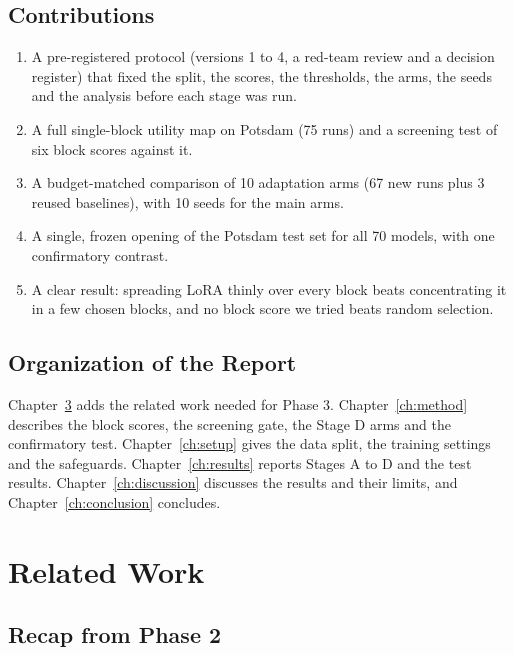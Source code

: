\documentclass[11pt,a4paper]{report}
\begin{document}
\section{Contributions}

\begin{enumerate}
    \item A pre-registered protocol (versions 1 to 4, a red-team review and a decision register) that fixed the split, the scores, the thresholds, the arms, the seeds and the analysis before each stage was run.
    \item A full single-block utility map on Potsdam (75 runs) and a screening test of six block scores against it.
    \item A budget-matched comparison of 10 adaptation arms (67 new runs plus 3 reused baselines), with 10 seeds for the main arms.
    \item A single, frozen opening of the Potsdam test set for all 70 models, with one confirmatory contrast.
    \item A clear result: spreading LoRA thinly over every block beats concentrating it in a few chosen blocks, and no block score we tried beats random selection.
\end{enumerate}

\section{Organization of the Report}

Chapter~\ref{ch:related} adds the related work needed for Phase 3. Chapter~\ref{ch:method} describes the block scores, the screening gate, the Stage D arms and the confirmatory test. Chapter~\ref{ch:setup} gives the data split, the training settings and the safeguards. Chapter~\ref{ch:results} reports Stages A to D and the test results. Chapter~\ref{ch:discussion} discusses the results and their limits, and Chapter~\ref{ch:conclusion} concludes.

\chapter{Related Work}
\label{ch:related}

\section{Recap from Phase 2}
\end{document}
